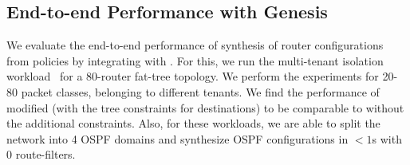 \subsection{End-to-end Performance with Genesis} \label{sec:genzep}
We evaluate the end-to-end performance 
of synthesis of router configurations from policies 
by integrating \name with \genesis. For this, we run
the multi-tenant isolation workload~\cite{genesis} for
a 80-router fat-tree topology. We perform the experiments
for 20-80 packet classes, belonging to different tenants. 
We find the performance of modified \genesis (with the tree
constraints for destinations) to be comparable to \genesis 
without the additional constraints. Also, for these workloads, we are able to 
split the network into 4 OSPF domains and synthesize OSPF
configurations in $<1$s with 0 route-filters.